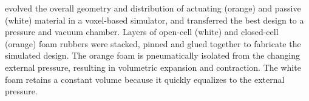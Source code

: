 
\citet{hiller2011automatic} 
evolved the overall geometry and distribution of actuating (orange) and passive (white) material in a voxel-based simulator, and transferred the best design to a pressure and vacuum chamber.
Layers of open-cell (white) and closed-cell (orange) foam rubbers were stacked, pinned and glued together to fabricate the simulated design.
The orange foam is pneumatically isolated from the changing external pressure, resulting in volumetric expansion and contraction.
The white foam retains a constant volume because it quickly equalizes to the external pressure.




